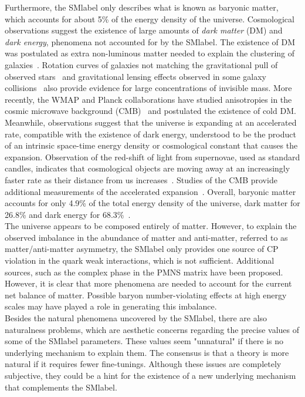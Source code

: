 Furthermore, the \acrshort{SMlabel} only describes what is known as baryonic matter, which accounts for about 5\% of the energy density of the universe. Cosmological observations suggest the existence of large amounts of \textit{dark matter} (DM) and \textit{dark energy}, phenomena not accounted for by the \acrshort{SMlabel}. The existence of DM was postulated as extra non-luminous matter needed to explain the clustering of galaxies~\cite{Zwicky2009}. Rotation curves of galaxies not matching the gravitational pull of observed stars~\cite{1981AJ.....86.1825B} and gravitational lensing effects observed in some galaxy collisions~\cite{Umetsu_2016} also provide evidence for large concentrations of invisible mass. More recently, the WMAP and Planck collaborations have studied anisotropies in the cosmic microwave background (CMB)~\cite{Bennett_2013,Planckcollab} and postulated the existence of cold DM. Meanwhile, observations suggest that the universe is expanding at an accelerated rate, compatible with the existence of dark energy, understood to be the product of an intrinsic space-time energy density or cosmological constant that causes the expansion. Observation of the red-shift of light from supernovae, used as standard candles, indicates that cosmological objects are moving away at an increasingly faster rate as their distance from us increases~\cite{1929PNAS...15..168H}. Studies of the CMB provide additional measurements of the accelerated expansion~\cite{Planckcollab}. Overall, baryonic matter accounts for only 4.9\% of the total energy density of the universe, dark matter for 26.8\% and dark energy for 68.3\%~\cite{Planckcollab}.\\

The universe appears to be composed entirely of matter. However, to explain the observed imbalance in the abundance of matter and anti-matter, referred to as matter/anti-matter asymmetry, the \acrshort{SMlabel} only provides one source of CP violation in the quark weak interactions, which is not sufficient. Additional sources, such as the complex phase in the PMNS matrix have been proposed. However, it is clear that more phenomena are needed to account for the current net balance of matter. Possible baryon number-violating effects at high energy scales may have played a role in generating this imbalance.\\

Besides the natural phenomena uncovered by the \acrshort{SMlabel}, there are also naturalness problems, which are aesthetic concerns regarding the precise values of some of the \acrshort{SMlabel} parameters. These values seem "unnatural" if there is no underlying mechanism to explain them. The consensus is that a theory is more natural if it requires fewer fine-tunings. Although these issues are completely subjective, they could be a hint for the existence of a new underlying mechanism that complements the \acrshort{SMlabel}.\\

